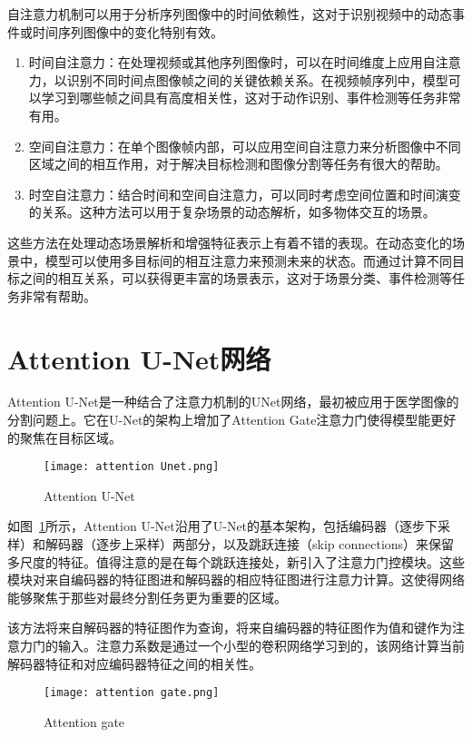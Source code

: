 自注意力机制可以用于分析序列图像中的时间依赖性，这对于识别视频中的动态事件或时间序列图像中的变化特别有效。
\begin{enumerate}    
  \item 时间自注意力：在处理视频或其他序列图像时，可以在时间维度上应用自注意力，以识别不同时间点图像帧之间的关键依赖关系。在视频帧序列中，模型可以学习到哪些帧之间具有高度相关性，这对于动作识别、事件检测等任务非常有用。
  \item 空间自注意力：在单个图像帧内部，可以应用空间自注意力来分析图像中不同区域之间的相互作用，对于解决目标检测和图像分割等任务有很大的帮助。
  \item 时空自注意力：结合时间和空间自注意力，可以同时考虑空间位置和时间演变的关系。这种方法可以用于复杂场景的动态解析，如多物体交互的场景。
\end{enumerate}
 这些方法在处理动态场景解析和增强特征表示上有着不错的表现。在动态变化的场景中，模型可以使用多目标间的相互注意力来预测未来的状态。而通过计算不同目标之间的相互关系，可以获得更丰富的场景表示，这对于场景分类、事件检测等任务非常有帮助。


\section{Attention U-Net网络}
Attention U-Net是一种结合了注意力机制的UNet网络，最初被应用于医学图像的分割问题上。它在U-Net的架构上增加了Attention Gate注意力门使得模型能更好的聚焦在目标区域。
\begin{figure}[h]
  \centering
  \texttt{[image: attention Unet.png]}
  \caption{Attention U-Net}
  \label{fig:attentionunet}
\end{figure}

如图~\ref{fig:attentionunet}所示，Attention U-Net沿用了U-Net的基本架构，包括编码器（逐步下采样）和解码器（逐步上采样）两部分，以及跳跃连接（skip connections）来保留多尺度的特征。值得注意的是在每个跳跃连接处，新引入了注意力门控模块。这些模块对来自编码器的特征图进和解码器的相应特征图进行注意力计算。这使得网络能够聚焦于那些对最终分割任务更为重要的区域。

该方法将来自解码器的特征图作为查询，将来自编码器的特征图作为值和键作为注意力门的输入。注意力系数是通过一个小型的卷积网络学习到的，该网络计算当前解码器特征和对应编码器特征之间的相关性。
\begin{figure}[h]
  \centering
  \texttt{[image: attention gate.png]}
  \caption{Attention gate}
  \label{fig:attentiongate}
\end{figure}


